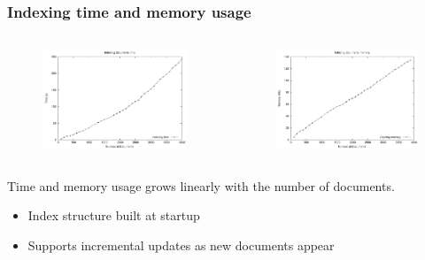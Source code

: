 \documentclass{beamer}
\begin{document}
\begin{frame}
\frametitle{Indexing time and memory usage}
\begin{columns}[T]
\centering
\begin{figure}
\includegraphics[scale=0.46]{imgs/index_time_d}
\end{figure}
\centering
\begin{figure}
\includegraphics[scale=0.46]{imgs/index_memo_d}
\end{figure}
\end{columns}
\scriptsize
\bigskip
Time and memory usage grows linearly with the number of documents.\\
\bigskip
\begin{itemize}
\item Index structure built at startup
\item Supports incremental updates as new documents appear
\end{itemize}
\bigskip
\end{frame}
\end{document}
